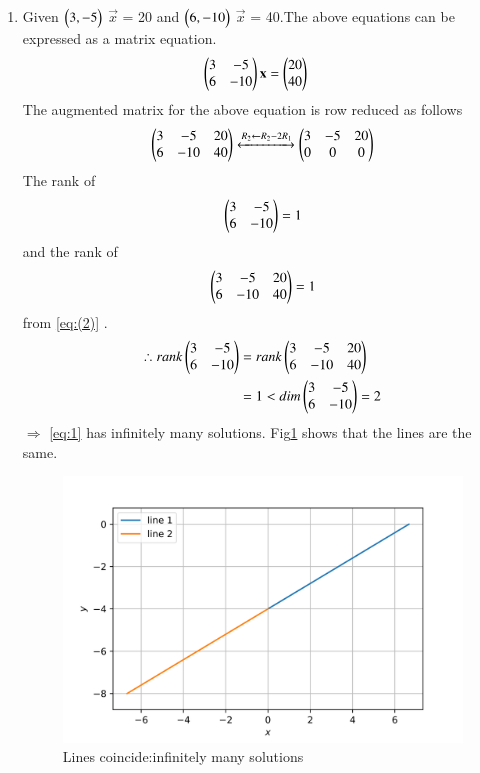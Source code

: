 \documentclass[journal,12pt,twocolumn]{IEEEtran}
\begin{document}
\begin{enumerate}
    \item Given $\begin{pmatrix}3, -5\end{pmatrix}$ $\vec{x}$ = 20 and $\begin{pmatrix}6,-10\end{pmatrix}$ $\vec{x}$ = 40.The above equations can be expressed as a matrix equation.
    \begin{align}
\label{eq:1}
  \begin{pmatrix}3&-5\\6&-10\end{pmatrix}\mathbf{x} &= \begin{pmatrix}20\\40\end{pmatrix}
\end{align}
The augmented matrix for the above equation
is row reduced as follows
\begin{align}
    \begin{pmatrix}3&-5&20\\6&-10&40\end{pmatrix}\xleftrightarrow{R_2\leftarrow R_2 -2R_1}\begin{pmatrix}3&-5&20\\0&0&0\end{pmatrix} \label{eq:(2)}
\end{align}
The rank of\begin{equation} 
\begin{pmatrix}3&-5\\6&-10\end{pmatrix} = 1
\end{equation} and the rank of
\begin{equation} 
\begin{pmatrix}3&-5&20\\6&-10&40\end{pmatrix} = 1
\end{equation}from \ref{eq:(2)} .
\begin{align}
    \therefore rank \begin{pmatrix}3&-5\\6&-10\end{pmatrix} &= rank\begin{pmatrix}3&-5&20\\6&-10&40\end{pmatrix}\\
    &=1 < dim\begin{pmatrix}3&-5\\6&-10\end{pmatrix}=2
\end{align}
$\Longrightarrow$ \ref{eq:1} has infinitely many solutions.
Fig\ref{fig:1} shows that the lines are the same.
\begin{figure}[H] 
    \includegraphics[width= \columnwidth]{assignment2c-1.png}
    \caption{Lines coincide:infinitely many solutions}
    \label{fig:1}
\end{figure}



\end{enumerate}
\end{document}
